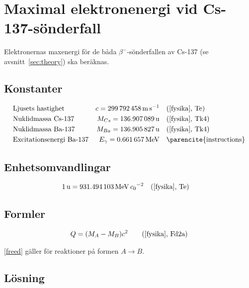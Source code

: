 \section{Maximal elektronenergi vid Cs-137-sönderfall} \label{sec:energy}

Elektronernas maxenergi för de båda $\beta^-$-sönderfallen av Cs-137 (se
avsnitt~\ref{sec:theory}) ska beräknas.

\subsection*{Konstanter}

\begin{align*}
    & \text{Ljusets hastighet}        & c        = \qty{299792458}{\m\per\s}         &\quad \fysika{Te}  \\
    & \text{Nuklidmassa Cs-137}       & M_{Cs}   = \qty{136.907089}{\atomicmassunit} &\quad \fysika{Tk4} \\
    & \text{Nuklidmassa Ba-137}       & M_{Ba}   = \qty{136.905827}{\atomicmassunit} &\quad \fysika{Tk4} \\
    & \text{Excitationsenergi Ba-137} & E_\gamma = \qty{0.661657}{\MeV}              &\quad \text{\parencite{instructions}}
\end{align*}

\subsection*{Enhetsomvandlingar}

\begin{align*}
    & \qty{1}{\atomicmassunit} = \qty{931.494103}{\MeV\per\clight\squared} \quad \fysika{Te}
\end{align*}

\subsection*{Formler}

\begin{align}
    Q &= (M_A - M_B)c^2 &\quad \fysika{Fd2a} \label{freed}
\end{align}

\eqref{freed} gäller för reaktioner på formen $A \longrightarrow B$.

\subsection*{Lösning}

